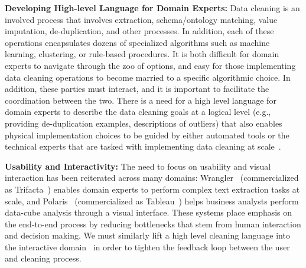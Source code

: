 
\vspace{0.5em}
\noindent\textbf{Developing High-level Language for Domain Experts:} Data cleaning is an involved process that involves extraction, schema/ontology matching, value imputation, de-duplication, and other processes.
In addition, each of these operations encapsulates dozens of specialized algorithms such as machine learning, clustering, or rule-based procedures.
It is both difficult for domain experts to navigate through the zoo of options, and easy for those implementing data cleaning operations to become married to a specific algorithmic choice.
In addition, these parties must interact, and it is important to facilitate the coordination between the two.
There is a need for a high level language for domain experts to describe the data cleaning goals at a logical level (e.g., providing de-duplication examples, descriptions of outliers) that also enables physical implementation choices to be guided by either automated tools or the technical experts that are tasked with implementing data cleaning at scale~\cite{DBLP:conf/sigmod/Galhardas00,wisteria}. 

\vspace{0.5em}
\noindent\textbf{Usability and Interactivity:} The need to focus on usability and visual interaction has been reiterated across many domains:  Wrangler~\cite{kandel2011wrangler} (commercialized as Trifacta~\cite{trifacta}) enables domain experts to perform complex text extraction tasks at scale, and  Polaris~\cite{stolte2002polaris} (commercialized as Tableau~\cite{tableau}) helps business analysts perform data-cube analysis through a visual interface. These systems place emphasis on the end-to-end process by reducing bottlenecks that stem from human interaction and decision making.    We must similarly lift a high level cleaning language into the interactive domain~\cite{heer2015predictive} in order to tighten the feedback loop between the user and cleaning process.


